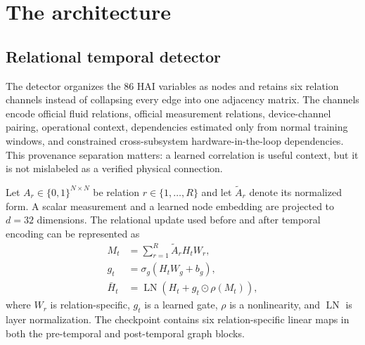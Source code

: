 \section{The \system{} architecture}
\label{sec:method}

\subsection{Relational temporal detector}

The detector organizes the 86 HAI variables as nodes and retains six relation channels instead of collapsing every edge into one adjacency matrix. The channels encode official fluid relations, official measurement relations, device-channel pairing, operational context, dependencies estimated only from normal training windows, and constrained cross-subsystem hardware-in-the-loop dependencies. This provenance separation matters: a learned correlation is useful context, but it is not mislabeled as a verified physical connection.

Let $A_r\in\{0,1\}^{N\times N}$ be relation $r\in\{1,\ldots,R\}$ and let $\widetilde A_r$ denote its normalized form. A scalar measurement and a learned node embedding are projected to $d=32$ dimensions. The relational update used before and after temporal encoding can be represented as
\begin{align}
M_t &= \sum_{r=1}^{R}\widetilde A_r H_t W_r, \\
g_t &= \sigma_g(H_tW_g+b_g), \\
\bar H_t &= \operatorname{LN}\!\left(H_t+g_t\odot\rho(M_t)\right),
\label{eq:relgraph}
\end{align}
where $W_r$ is relation-specific, $g_t$ is a learned gate, $\rho$ is a nonlinearity, and $\operatorname{LN}$ is layer normalization. The checkpoint contains six relation-specific linear maps in both the pre-temporal and post-temporal graph blocks.

